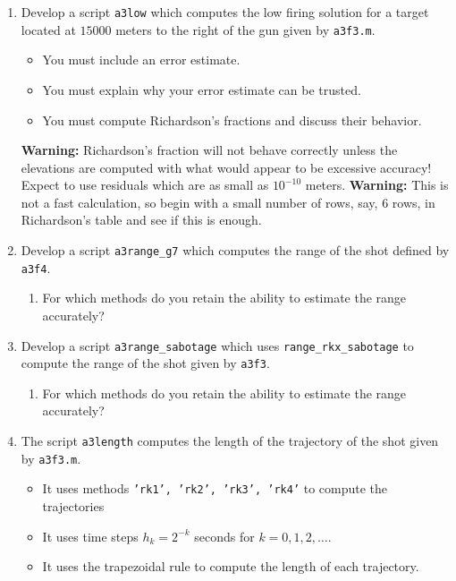 \documentclass[a4paper,12pt]{article}
\begin{document}
\begin{enumerate}
\item \label{q:elevation} Develop a script {\tt a3low} which computes the low firing solution for a target located at $15000$ meters to the right of the gun given by {\tt a3f3.m}.
  \begin{itemize}
  \item You must include an error estimate.
  \item You must explain why your error estimate can be trusted.
  \item You must compute Richardson's fractions and discuss their behavior.
  \end{itemize}
  {\bf Warning:} Richardson's fraction will not behave correctly unless the elevations are computed with what would appear to be excessive accuracy! Expect to use residuals which are as small as $10^{-10}$ meters.
  {\bf Warning:} This is not a fast calculation, so begin with a small number of rows, say, 6 rows, in Richardson's table and see if this is enough.

\item \label{q:smooth} Develop a script {\tt a3range\_g7} which computes the range of the shot defined by {\tt a3f4}. 
\begin{enumerate}
\item For which methods do you retain the ability to estimate the range accurately?
\end{enumerate}

\item \label{q:sabotage} Develop a script {\tt a3range\_sabotage} which uses {\tt range\_rkx\_sabotage} to compute the range of the shot given by {\tt a3f3}. 
\begin{enumerate}
\item For which methods do you retain the ability to estimate the range accurately?
\end{enumerate}

\item \label{q:length} The script {\tt a3length} computes the length of the trajectory of the shot given by {\tt a3f3.m}.
  \begin{itemize}
  \item It uses methods {\tt 'rk1', 'rk2', 'rk3', 'rk4'} to compute the trajectories
  \item It uses time steps $h_k = 2^{-k}$ seconds for $k=0,1,2,\dotsc$.
  \item It uses the trapezoidal rule to compute the length of each trajectory.
  \end{itemize}



\end{enumerate}
\end{document}
